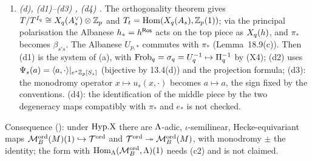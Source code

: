 \begin{outline}
\begin{enumerate}[label=(\arabic*)]
\item \emph{(d), (d1)--(d3) \stpmc{}, (d4) \stsketch.} The orthogonality theorem \cite[Exp.~IX, Thm.~2.4, p.~338]{SGA7} gives
  $T/T^{I_q}\cong X_q(A_s^\vee)\otimes\mathbb{Z}_p$ and $T_t=\operatorname{Hom}(X_q(A_s),\mathbb{Z}_p(1))$; via the principal polarisation the Albanese $h_*=h^{\mathsf{Ros}}$ acts on
  the top piece as $X_q(h)$, and $\pi_*$ becomes $\beta_{s's}$. The Albanese $U_{p,*}$ commutes with $\pi_*$ (Lemma~18.9(c)). Then (d1) is the
  system of (a), with $\mathrm{Frob}_q=\sigma_q=U_q^{-1}\mapsto\Pi_q^{-1}$ by (X4); (d2) uses $\Psi_s(a)=\langle a,\cdot\rangle|_{e^*\mathbb{Z}_p[S_s]}$ (bijective by 13.4(d))
  and the projection formula; (d3): the monodromy operator $x\mapsto u_s(x,\cdot)$ becomes $a\mapsto a$, the sign fixed by the conventions.
  (d4): the identification of the middle piece by the two degeneracy maps compatibly with $\pi_*$ and $e_*$ is not checked.
\end{enumerate}
Consequence (\stpmc): under $\mathrm{Hyp.X}$ there are $\Lambda$-adic, $\iota$-semilinear, Hecke-equivariant maps $\mathcal{M}^{\mathrm{ord}}_B(M)(1)\hookrightarrow\mathcal{T}^{\mathrm{ord}}$ and
$\mathcal{T}^{\mathrm{ord}}\twoheadrightarrow\mathcal{M}^{\mathrm{ord}}_B(M)$, with monodromy $\pm$ the identity; the form with $\operatorname{Hom}_\Lambda(\mathcal{M}^{\mathrm{ord}}_B,\Lambda)(1)$ needs (c2) and is not claimed.
\end{outline}

